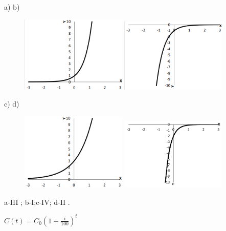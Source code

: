 \begin{respostas}{3}
	\ansitem{} a) \tab b)

\begin{figure}[H]
    \includegraphics[width=0.45\textwidth]{capitulos/potencias_e_funcoes_exponenciais/media/image37.png} 
    \includegraphics[width=0.45\textwidth]{capitulos/potencias_e_funcoes_exponenciais/media/image38.png}
\end{figure}

    c) \tab d)

\begin{figure}[H]
    \includegraphics[width=0.45\textwidth]{capitulos/potencias_e_funcoes_exponenciais/media/image39.png} 
    \includegraphics[width=0.45\textwidth]{capitulos/potencias_e_funcoes_exponenciais/media/image40.pdf}
\end{figure}


    \ansitem{} a-III ; b-I;c-IV;  d-II . 

	\ansitem{} \( C \left( t \right) =C_{0} \left( 1+\frac{i}{100} \right) ^{t} \)
\end{respostas}

